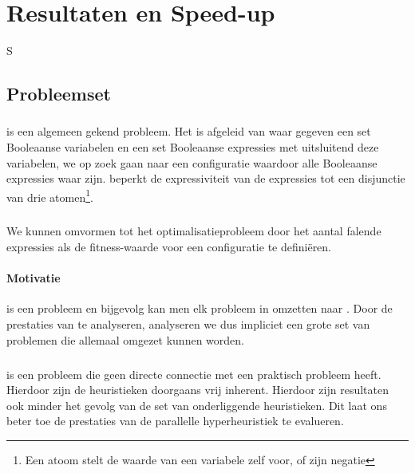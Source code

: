 \chapter{Resultaten en Speed-up}
\label{hoofdstuk:4}
S
\section{Probleemset}

\subsection{}

 is een algemeen gekend probleem. Het is afgeleid van  waar gegeven een set Booleaanse variabelen en een set Booleaanse expressies met uitsluitend deze variabelen, we op zoek gaan naar een configuratie waardoor alle Booleaanse expressies waar zijn.  beperkt de expressiviteit van de expressies tot een disjunctie van drie atomen\footnote{Een atoom stelt de waarde van een variabele zelf voor, of zijn negatie}.

\paragraph{}
We kunnen  omvormen tot het optimalisatieprobleem  door het aantal falende expressies als de fitness-waarde voor een configuratie te defini\"eren.

\subsubsection{Motivatie}

 is een  probleem en bijgevolg kan men elk probleem in  omzetten naar . Door de prestaties van  te analyseren, analyseren we dus impliciet een grote set van problemen die allemaal omgezet kunnen worden.

\paragraph{}
 is een probleem die geen directe connectie met een praktisch probleem heeft. Hierdoor zijn de heuristieken doorgaans vrij inherent. Hierdoor zijn resultaten ook minder het gevolg van de set van onderliggende heuristieken. Dit laat ons beter toe de prestaties van de parallelle hyperheuristiek te evalueren.

